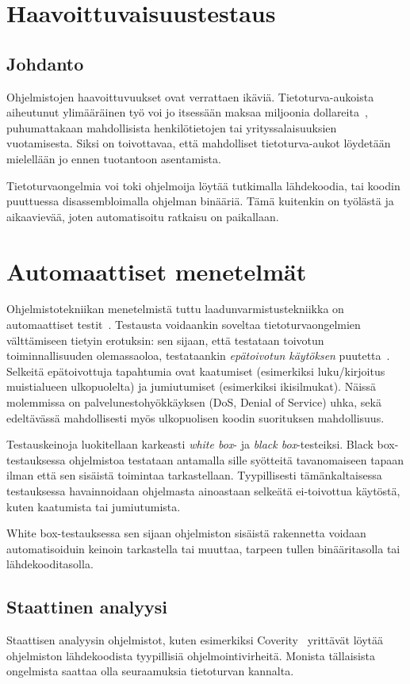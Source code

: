 \section{Haavoittuvaisuustestaus}

\subsection{Johdanto}
Ohjelmistojen haavoittuvuukset ovat verrattaen ikäviä.
Tietoturva-aukoista aiheutunut ylimääräinen työ voi jo itsessään maksaa miljoonia dollareita~\cite{SageArtikkeli},
puhumattakaan mahdollisista henkilötietojen tai yrityssalaisuuksien vuotamisesta.
Siksi on toivottavaa, että mahdolliset tietoturva-aukot löydetään mielellään jo ennen tuotantoon asentamista.

Tietoturvaongelmia voi toki ohjelmoija löytää tutkimalla lähdekoodia,
tai koodin puuttuessa disassembloimalla ohjelman binääriä.
Tämä kuitenkin on työlästä ja aikaavievää, joten automatisoitu ratkaisu on paikallaan.

\section{Automaattiset menetelmät}

Ohjelmistotekniikan menetelmistä tuttu laadunvarmistustekniikka on automaattiset testit~\cite{Somerville}.
Testausta voidaankin soveltaa tietoturvaongelmien välttämiseen tietyin erotuksin:
sen sijaan, että testataan toivotun toiminnallisuuden olemassaoloa,
testataankin \emph{epätoivotun käytöksen} puutetta~\cite{OuluBrowser}.
Selkeitä epätoivottuja tapahtumia ovat kaatumiset (esimerkiksi luku/kirjoitus muistialueen ulkopuolelta) ja jumiutumiset (esimerkiksi ikisilmukat).
Näissä molemmissa on palvelunestohyökkäyksen (DoS, Denial of Service) uhka,
sekä edeltävässä mahdollisesti myös ulkopuolisen koodin suorituksen mahdollisuus.

Testauskeinoja luokitellaan karkeasti \emph{white box}- ja \emph{black box}-testeiksi.
Black box-testauksessa ohjelmistoa testataan antamalla sille syötteitä tavanomaiseen tapaan ilman että sen sisäistä toimintaa tarkastellaan.
Tyypillisesti tämänkaltaisessa testauksessa havainnoidaan ohjelmasta ainoastaan selkeätä ei-toivottua käytöstä, kuten kaatumista tai jumiutumista.

White box-testauksessa sen sijaan ohjelmiston sisäistä rakennetta voidaan automatisoiduin keinoin
tarkastella tai muuttaa, tarpeen tullen binääritasolla tai lähdekooditasolla.

\subsection{Staattinen analyysi}

Staattisen analyysin ohjelmistot, kuten esimerkiksi Coverity~\cite{Coverity} yrittävät löytää ohjelmiston lähdekoodista tyypillisiä ohjelmointivirheitä.
Monista tällaisista ongelmista saattaa olla seuraamuksia tietoturvan kannalta.



